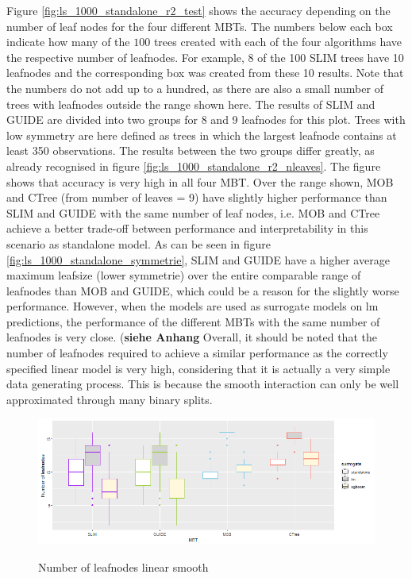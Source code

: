 Figure \ref{fig:ls_1000_standalone_r2_test} shows the accuracy depending on the number of leaf nodes for the four different MBTs.
The numbers below each box indicate how many of the $100$ trees created with each of the four algorithms have the respective number of leafnodes. For example, 8 of the 100 SLIM trees have 10 leafnodes and the corresponding box was created from these 10 results. Note that the numbers do not add up to a hundred, as there are also a small number of trees with leafnodes outside the range shown here. The results of SLIM and GUIDE are divided into two groups for 8 and 9 leafnodes for this plot. Trees with low symmetry are here defined as trees in which the largest leafnode contains at least 350 observations. The results between the two groups differ greatly, as already recognised in figure \ref{fig:ls_1000_standalone_r2_nleaves}.
The figure shows that accuracy is very high in all four MBT. Over the range shown, MOB and CTree (from number of leaves = 9) have slightly higher performance than SLIM and GUIDE with the same number of leaf nodes, i.e. MOB and CTree achieve a better trade-off between performance and interpretability in this scenario as standalone model.
As can be seen in figure \ref{fig:ls_1000_standalone_symmetrie}, SLIM and GUIDE have a higher average maximum leafsize (lower symmetrie) over the entire comparable range of leafnodes than MOB and GUIDE, which could be a reason for the slightly worse performance.
However, when the models are used as surrogate models on lm predictions, the performance of the different MBTs with the same number of leafnodes is very close. (\textbf{siehe Anhang}
Overall, it should  be noted that the number of leafnodes required to achieve a similar performance as the correctly specified linear model is very high, considering that it is actually a very simple data generating process. This is because the smooth interaction can only be well approximated through many binary splits. 






\begin{figure}[!htb] 
\caption{Number of leafnodes linear smooth}
    \includegraphics[width=16cm]{Figures/simulations/batchtools/basic_scenarios/linear_smooth/ls_1000_int.png}
    \label{fig:ls_1000_int}
\end{figure} 



